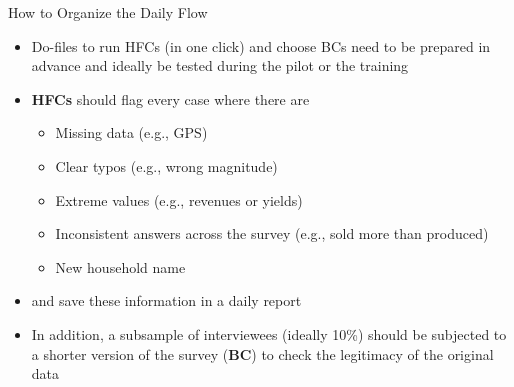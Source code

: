 \documentclass[aspectratio=169]{beamer}
\begin{document}
\begin{frame}{How to Organize the Daily Flow}

\begin{itemize}
    \setlength\itemsep{1.4em}
    
    \item Do-files to run HFCs (in one click) and choose BCs need to be prepared in advance and ideally be tested during the pilot or the training
    
    \item \textbf{HFCs} should flag every case where there are
    \begin{itemize}
        \item Missing data (e.g., GPS)
        \item Clear typos (e.g., wrong magnitude)
        \item Extreme values (e.g., revenues or yields)
        \item Inconsistent answers across the survey (e.g., sold more than produced)
        \item New household name
    \end{itemize}
    \vspace{-1.25em}
    \item and save these information in a daily report
    
    \pause
    \item In addition, a subsample of interviewees (ideally 10\%) should be subjected to a shorter version of the survey (\textbf{BC}) to check the legitimacy of the original data
    
\end{itemize}
\end{frame}
\end{document}
